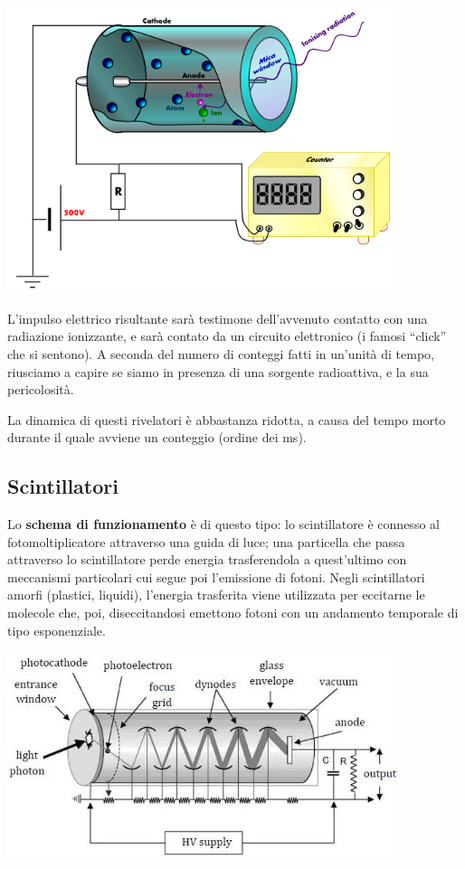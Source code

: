 \documentclass[a4paper,11pt,twoside,openany]{book}
\theoremstyle{definition}
\theoremstyle{plain}
\theoremstyle{plain}
\theoremstyle{definition}
\begin{document}
\begin{center}
\includegraphics[width=4.5in]{immagini/geiger.jpg} %
\end{center}

L'impulso elettrico risultante sarà testimone dell'avvenuto contatto con una radiazione ionizzante, e sarà contato da un circuito elettronico (i famosi “click” che si sentono). A seconda del numero di conteggi fatti in un'unità di tempo, riusciamo a capire se siamo in presenza di una sorgente radioattiva, e la sua pericolosità.

La dinamica di questi rivelatori è abbastanza ridotta, a causa del tempo morto durante il quale avviene un conteggio (ordine dei ms).

\subsection{Scintillatori} %
Lo \textbf{schema di funzionamento} è di questo tipo: lo scintillatore è connesso al fotomoltiplicatore attraverso una guida di luce; una particella che passa attraverso lo scintillatore perde energia trasferendola a quest'ultimo con meccanismi particolari cui segue poi l'emissione di fotoni. Negli scintillatori amorfi (plastici, liquidi), l'energia trasferita viene utilizzata per eccitarne le molecole che, poi, diseccitandosi emettono fotoni con un andamento temporale di tipo esponenziale.

\begin{center}
\includegraphics[width=4.5in]{immagini/scintillatore.jpg} %
\end{center}
\end{document}
